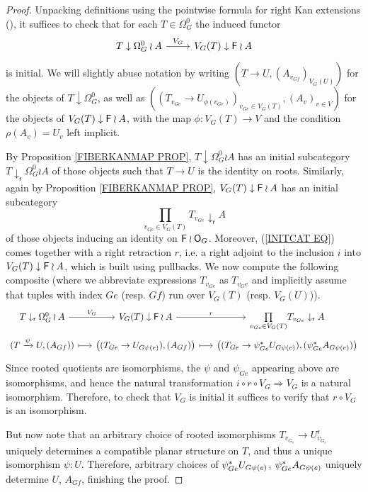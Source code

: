 \documentclass[a4paper,10pt]{article}%
\begin{document}
\begin{proof}
	Unpacking definitions using the pointwise formula for right  Kan extensions (\cite[X.3.1]{McL}), 
	it suffices to check that for each $T \in \Omega_{G}^{0}$ the induced functor
\begin{equation}\label{LANPULLCOMA EQ}
\begin{tikzcd}
	T \downarrow \Omega_{G}^{0} \wr A \ar{r}{V_G} & 
	V_G(T) \downarrow \Fin \wr A
\end{tikzcd}
\end{equation}
is initial.
We will slightly abuse notation by writing 
$(T \to U, (A_{v_{G f}})_{V_G(U)})$ for the objects of 
$T \downarrow \Omega_{G}^{0}$,
as well as 
$
\left(
	(T_{v_{G e}} \to U_{\phi(v_{Ge})})_{v_{G e} \in V_G(T)},
	(A_v)_{v \in V}
\right)
$
for the objects of 
$V_G(T) \downarrow \mathsf{F} \wr A$,
with the map $\phi \colon V_G(T) \to V$ and the condition 
$\rho(A_v) = U_v$ left implicit.

By Proposition \ref{FIBERKANMAP PROP}, $T \downarrow \Omega_{G}^{0} \wr A$ has an initial subcategory
$T \downarrow_{\mathsf{r}} \Omega_{G}^{0} \wr A$
of those objects such that $T \to U$ is the identity on roots. 
Similarly, again by Proposition \ref{FIBERKANMAP PROP},
$V_G(T) \downarrow \mathsf{F} \wr A$
has an initial subcategory
\begin{equation}\label{INITCAT EQ}
	\prod_{v_{Ge} \in V_G(T)} 
	T_{v_{Ge}} \downarrow_{\mathsf{r}} A
\end{equation}
of those objects inducing an identity on $\mathsf{F} \wr \mathsf{O}_G$. Moreover, 
(\ref{INITCAT EQ}) comes together with a right retraction $r$,
i.e. a right adjoint to the inclusion $i$ into $V_G(T) \downarrow \mathsf{F} \wr A$, 
which is built using pullbacks. 
We now compute the following composite
(where we abbreviate expressions $T_{v_{G e}}$ as 
$T_{v_Ge}$ and implicitly assume that tuples with index $G e$ (resp. $G f$) run over $V_G(T)$ (resp. $V_G(U)$)).
\[
\begin{tikzcd}[column sep =1.5em , row sep =0em]
	T \downarrow_{\mathsf{r}} \Omega_{G}^{0} \wr A 
	\ar{r}{V_G} &
	V_G(T) \downarrow \Fin \wr A \ar{r}{r} &
	\underset{v_{Ge} \in V_G(T)}{\prod} 
	T_{v_{Ge}} \downarrow_{\mathsf{r}} A
\\
	(T \xrightarrow{\psi} U, (A_{{G f}})) \ar[mapsto]{r} &
	\left(
		(T_{{G e}} \to U_{{G \psi(e)}}),
		(A_{{G f}})
	\right) \ar[mapsto]{r} &
	\left(
		(T_{{G e}} \to \psi_{G e}^{\**} U_{{G \psi(e)}}),
		(\psi_{G e}^{\**} A_{{G \psi(e)}})
	\right)
\end{tikzcd}
\]
Since rooted quotients are isomorphisms, the $\psi$
and $\psi_{Ge}$ appearing above are isomorphisms, 
and hence the natural transformation
$i \circ r \circ V_G \Rightarrow V_G$
is a natural isomorphism. Therefore, to check that $V_G$ is initial it suffices to verify that 
$r \circ V_G$ is an isomorphism.

But now note that an arbitrary choice of rooted isomorphisms
$T_{v_{G_e}} \to U^{\mathsf{r}}_{v_{G_e}}$
uniquely determines a compatible planar structure on $T$, and thus a unique isomorphism $\psi \colon U$.
Therefore, arbitrary choices of 
$\psi_{G e}^{\**} U_{{G \psi(e)}}$,
$\psi_{G e}^{\**} A_{{G \psi(e)}}$
uniquely determine $U$, $A_{G f}$, finishing the proof.
\end{proof}
\end{document}

